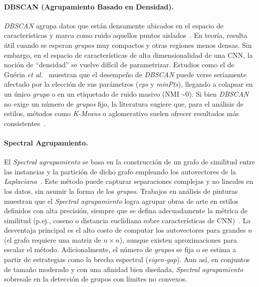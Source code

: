 \paragraph{DBSCAN (Agrupamiento Basado en Densidad).}
\textit{DBSCAN} agrupa datos que están densamente ubicados en el espacio de características y marca como ruido aquellos puntos aislados~\cite{guerin2018}.
En teoría, resulta útil cuando se esperan \textit{grupos} muy compactos y otras regiones menos densas.
Sin embargo, en el espacio de características de alta dimensionalidad de una CNN, la noción de “densidad” se vuelve difícil de parametrizar.
Estudios como el de Guérin \textit{et al.}~\cite{guerin2018} muestran que el desempeño de \textit{DBSCAN} puede verse seriamente afectado por la elección de sus parámetros (\textit{eps} y \textit{minPts}), llegando a colapsar en un único \textit{grupo} o en un etiquetado de ruido masivo (NMI \textasciitilde 0).
Si bien \textit{DBSCAN} no exige un número de \textit{grupos} fijo, la literatura sugiere que, para el análisis de estilos, métodos como \textit{K-Means} o aglomerativo suelen ofrecer resultados más consistentes~\cite{dangeti2024}.

\paragraph{Spectral Agrupamiento.}
El \textit{Spectral agrupamiento} se basa en la construcción de un grafo de similitud entre las instancias y la partición de dicho grafo empleando los autovectores de la \textit{Laplaciana}~\cite{guerin2018,gultepe2018}.
Este método puede capturar separaciones complejas y no lineales en los datos, sin asumir la forma de los \textit{grupos}.
Trabajos en análisis de pinturas muestran que el \textit{Spectral agrupamiento} logra agrupar obras de arte en estilos definidos con alta precisión, siempre que se defina adecuadamente la métrica de similitud (p.ej., coseno o distancia euclidiana sobre características de CNN)~\cite{gultepe2018}.
La desventaja principal es el alto costo de computar los autovectores para grandes $n$ (el grafo requiere una matriz de $n \times n$), aunque existen aproximaciones para escalar el método.
Adicionalmente, el número de \textit{grupos} se fija o se estima a partir de estrategias como la brecha espectral (\textit{eigen-gap}).
Aun así, en conjuntos de tamaño moderado y con una afinidad bien diseñada, \textit{Spectral agrupamiento} sobresale en la detección de grupos con límites no convexos.

